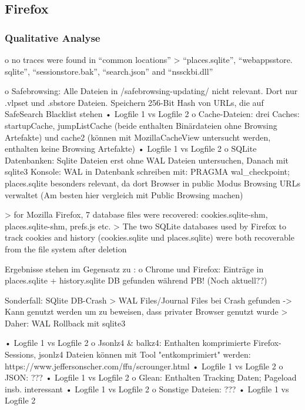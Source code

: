 \subsection{Firefox}

\subsubsection*{Qualitative Analyse}

o no traces were found in “common locations” \cite{Montasari.2015}
	>  “places.sqlite”, “webappsstore. sqlite”, “sessionstore.bak”, “search.json” and “nssckbi.dll”


o	Safebrowsing: Alle Dateien in /safebrowsing-updating/ nicht relevant. Dort nur .vlpset und .sbstore Dateien. Speichern 256-Bit Hash von URLs, die auf SafeSearch Blacklist stehen 
	•	Logfile 1 vs Logfile 2
o	Cache-Dateien: drei Caches: startupCache, jumpListCache (beide enthalten Binärdateien ohne Browsing Artefakte) und cache2 (können mit MozillaCacheView untersucht werden, enthalten keine Browsing Artefakte)
	•	Logfile 1 vs Logfile 2
o	SQLite Datenbanken: Sqlite Dateien erst ohne WAL Dateien untersuchen, Danach mit sqlite3 Konsole: WAL in Datenbank schreiben mit: PRAGMA wal\_checkpoint; places.sqlite besonders relevant, da dort Browser in public Modus Browsing URLs verwaltet (Am besten hier vergleich mit Public Browsing machen)
	
	> \cite{Fayyad.2021} for Mozilla Firefox, 7 database files were recovered: cookies.sqlite-shm, places.sqlite-shm, prefs.js etc.
	> \cite{Muir.2019} The two SQLite databases used by Firefox to track cookies and history (cookies.sqlite und places.sqlite) were both recoverable from the file system after deletion
	
	Ergebnisse stehen im Gegensatz zu \cite{Hedberg.2013} :
		o	Chrome und Firefox: Einträge in places.sqlite + history.sqlite DB gefunden während PB! (Noch aktuell??)

	Sonderfall: SQlite DB-Crash \cite{Hedberg.2013}
		> WAL Files/Journal Files bei Crash gefunden -> Kann genutzt werden um zu beweisen, dass privater Browser genutzt wurde
		> Daher: WAL Rollback mit sqlite3
		

	•	Logfile 1 vs Logfile 2
o	Jsonlz4 \& balkz4: Enthalten komprimierte Firefox-Sessions, jsonlz4 Dateien können mit Tool "entkomprimiert" werden: https://www.jeffersonscher.com/ffu/scrounger.html
	•	Logfile 1 vs Logfile 2
o	JSON: ???
	•	Logfile 1 vs Logfile 2
o	Glean: Enthalten Tracking Daten; Pageload insb. interessant
	•	Logfile 1 vs Logfile 2
o	Sonstige Dateien: ???
	•	Logfile 1 vs Logfile 2

